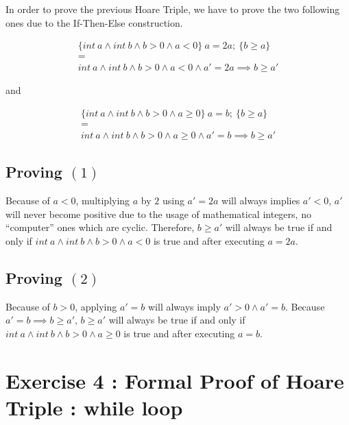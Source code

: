 \documentclass[a4paper,11pt]{report}
\begin{document}
In order to prove the previous Hoare Triple, we have to prove the two following
ones due to the If-Then-Else construction.

\begin{equation}
\begin{gathered}
  \{int\ a \wedge int\ b \wedge b > 0 \wedge a < 0\}\ a=2a;\ \{b \geq a\} \\
  = \\
  int\ a \wedge int\ b \wedge b > 0 \wedge a < 0 \wedge a'=2a \implies b \geq a'
\end{gathered}
\end{equation}

and

\begin{equation}
\begin{gathered}
  \{int\ a \wedge int\ b \wedge b > 0 \wedge a \geq 0\}\ a=b;\ \{b \geq a\} \\
  = \\
  int\ a \wedge int\ b \wedge b > 0 \wedge a \geq 0 \wedge a' = b \implies b \geq a'
\end{gathered}
\end{equation}

\subsection*{Proving $(1)$}

Because of $a < 0$, multiplying $a$ by $2$ using $a' = 2a$ will always implies
$a' < 0$, $a'$ will never become positive due to the usage of mathematical
integers, no ``computer'' ones which are cyclic. Therefore, $b \geq a'$ will
always be true if and only if $int\ a \wedge int\ b \wedge b > 0 \wedge a < 0$
is true and after executing $a=2a$.

\subsection*{Proving $(2)$}

Because of $b > 0$, applying $a' = b$ will always imply $a' > 0 \wedge a' =
b$. Because $a' = b \implies b \geq a'$, $b \geq a'$ will always be true if and
only if $int\ a \wedge int\ b \wedge b > 0 \wedge a \geq 0$ is true and after
executing $a = b$.

\section*{Exercise 4 : Formal Proof of Hoare Triple : while loop}
\end{document}
